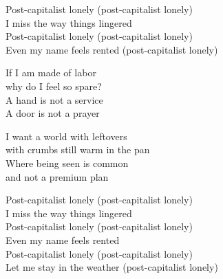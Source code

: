 \begin{lyrics}
Post-capitalist lonely (post-capitalist lonely)\\
I miss the way things lingered\\
Post-capitalist lonely (post-capitalist lonely)\\
Even my name feels rented
(post-capitalist lonely)

If I am made of labor\\
why do I feel so spare?\\
A hand is not a service\\
A door is not a prayer

I want a world with leftovers\\
with crumbs still warm in the pan\\
Where being seen is common\\
and not a premium plan

Post-capitalist lonely (post-capitalist lonely)\\
I miss the way things lingered\\
Post-capitalist lonely (post-capitalist lonely)\\
Even my name feels rented\\
Post-capitalist lonely (post-capitalist lonely)\\
Let me stay in the weather
(post-capitalist lonely)
\end{lyrics}

